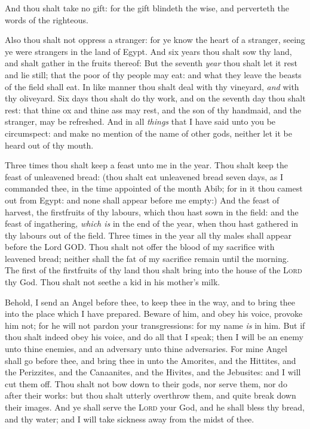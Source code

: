\documentclass[11pt,letterpaper,oneside]{memoir}
\begin{document}
And thou shalt take no gift: for the gift blindeth the wise, and
perverteth the words of the righteous.

Also thou shalt not oppress a stranger: for ye know the heart of a
stranger, seeing ye were strangers in the land of Egypt. And six years
thou shalt sow thy land, and shalt gather in the fruits thereof: But the
seventh \emph{year} thou shalt let it rest and lie still; that the poor
of thy people may eat: and what they leave the beasts of the field shall
eat. In like manner thou shalt deal with thy vineyard, \emph{and} with
thy oliveyard. Six days thou shalt do thy work, and on the seventh day
thou shalt rest: that thine ox and thine ass may rest, and the son of
thy handmaid, and the stranger, may be refreshed. And in all
\emph{things} that I have said unto you be circumspect: and make no
mention of the name of other gods, neither let it be heard out of thy
mouth.

Three times thou shalt keep a feast unto me in the year. Thou shalt keep
the feast of unleavened bread: (thou shalt eat unleavened bread seven
days, as I commanded thee, in the time appointed of the month Abib; for
in it thou camest out from Egypt: and none shall appear before me
empty:) And the feast of harvest, the firstfruits of thy labours, which
thou hast sown in the field: and the feast of ingathering, \emph{which
is} in the end of the year, when thou hast gathered in thy labours out
of the field. Three times in the year all thy males shall appear before
the Lord GOD. Thou shalt not offer the blood of my sacrifice with
leavened bread; neither shall the fat of my sacrifice remain until the
morning. The first of the firstfruits of thy land thou shalt bring into
the house of the \textsc{Lord} thy God. Thou shalt not seethe a kid in
his mother's milk.

Behold, I send an Angel before thee, to keep thee in the way, and to
bring thee into the place which I have prepared. Beware of him, and obey
his voice, provoke him not; for he will not pardon your transgressions:
for my name \emph{is} in him. But if thou shalt indeed obey his voice,
and do all that I speak; then I will be an enemy unto thine enemies, and
an adversary unto thine adversaries. For mine Angel shall go before
thee, and bring thee in unto the Amorites, and the Hittites, and the
Perizzites, and the Canaanites, and the Hivites, and the Jebusites: and
I will cut them off. Thou shalt not bow down to their gods, nor serve
them, nor do after their works: but thou shalt utterly overthrow them,
and quite break down their images. And ye shall serve the \textsc{Lord}
your God, and he shall bless thy bread, and thy water; and I will take
sickness away from the midst of thee.
\end{document}
